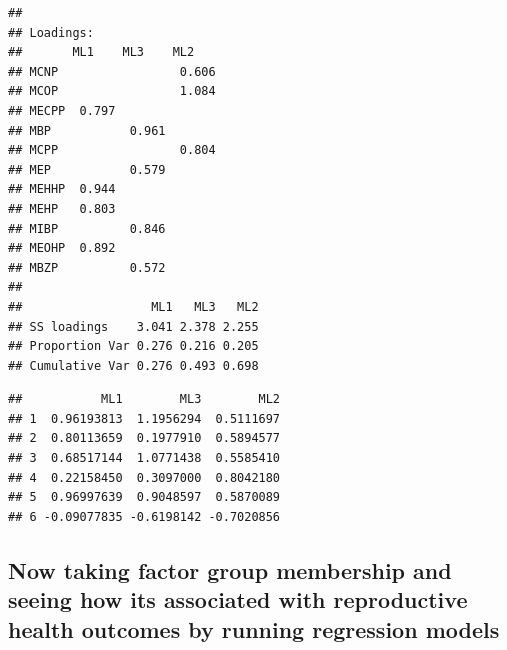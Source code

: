 \documentclass[
]{article}
\newenvironment{Shaded}{\begin{snugshade}}{\end{snugshade}}
\newcommand{\CommentTok}[1]{\textcolor[rgb]{0.56,0.35,0.01}{\textit{#1}}}
\newcommand{\FunctionTok}[1]{\textcolor[rgb]{0.13,0.29,0.53}{\textbf{#1}}}
\newcommand{\NormalTok}[1]{#1}
\newcommand{\OtherTok}[1]{\textcolor[rgb]{0.56,0.35,0.01}{#1}}
\newcommand{\SpecialCharTok}[1]{\textcolor[rgb]{0.81,0.36,0.00}{\textbf{#1}}}
\newcommand{\StringTok}[1]{\textcolor[rgb]{0.31,0.60,0.02}{#1}}
\begin{document}
\begin{verbatim}
## 
## Loadings:
##       ML1    ML3    ML2   
## MCNP                 0.606
## MCOP                 1.084
## MECPP  0.797              
## MBP           0.961       
## MCPP                 0.804
## MEP           0.579       
## MEHHP  0.944              
## MEHP   0.803              
## MIBP          0.846       
## MEOHP  0.892              
## MBZP          0.572       
## 
##                  ML1   ML3   ML2
## SS loadings    3.041 2.378 2.255
## Proportion Var 0.276 0.216 0.205
## Cumulative Var 0.276 0.493 0.698
\end{verbatim}

\begin{Shaded}
\end{Shaded}

\begin{verbatim}
##           ML1        ML3        ML2
## 1  0.96193813  1.1956294  0.5111697
## 2  0.80113659  0.1977910  0.5894577
## 3  0.68517144  1.0771438  0.5585410
## 4  0.22158450  0.3097000  0.8042180
## 5  0.96997639  0.9048597  0.5870089
## 6 -0.09077835 -0.6198142 -0.7020856
\end{verbatim}

\subsection{Now taking factor group membership and seeing how its
associated with reproductive health outcomes by running regression
models}\label{now-taking-factor-group-membership-and-seeing-how-its-associated-with-reproductive-health-outcomes-by-running-regression-models}

\begin{Shaded}
\end{Shaded}
\end{document}
